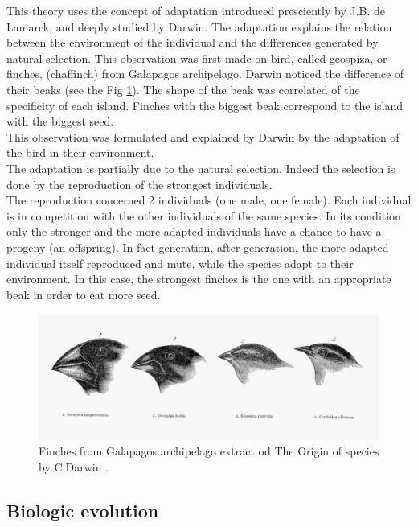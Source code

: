 This theory uses the concept of adaptation introduced presciently by J.B. de Lamarck, and deeply studied by Darwin. The adaptation explains the relation between the environment of the individual and the differences generated by natural selection. This observation was first made on bird, called geospiza, or finches, (chaffinch) from Galapagos archipelago. Darwin noticed the difference of their beaks (see the Fig \ref{fig:finchesFromGalapagos}). The shape of the beak was correlated of the specificity of each island. Finches with the biggest beak correspond to the island with the biggest seed. \\
This observation was formulated and explained by Darwin by the adaptation of the bird in their environment.\\ The adaptation is partially due to the natural selection. Indeed the selection is done by the reproduction of the strongest individuals.\\
The reproduction concerned 2 individuals (one male, one female). Each individual is in competition with the other individuals of the same species.  In its condition only the stronger and  the more adapted individuals   have a chance to have a progeny (an offspring). In fact generation, after generation, the more adapted individual itself reproduced and mute, while the species adapt to their environment.
In this case, the strongest finches is the one with an appropriate beak in order to eat more seed. 
\begin{figure}[t!]
   \includegraphics[width=\linewidth]{img/finchesFromGalapagos.jpeg}
  \caption{Finches from Galapagos archipelago extract od The Origin of species by C.Darwin .}\label{fig:finchesFromGalapagos}
  \endminipage\hfill
\end{figure}

\subsection{Biologic evolution }\label{subsec:BioEvolv}

